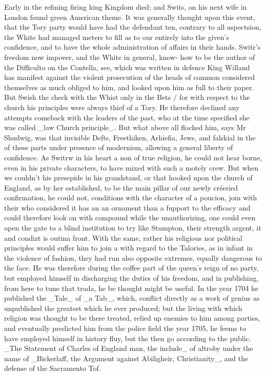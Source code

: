 Early in the refining firing king Kingdom died; and Swits, on his next wife in London found green American theme. It was generally thought upon this event, that the Tory party would have had the defendant ten, contrary to all aspectsion, the White had managed meters to fill as to our entirely into the given’s confidence, and to have the whole administration of affairs in their hands. Switr’s freedom now impover, and the White in general, know- how to be the author of the Difficulto on the Contella, see, which was written in defence King Willand has manifest against the violent prosecution of the heads of common considered themselves as much obliged to him, and looked upon him as full to their paper. But Swish the check with the Whist only in the Bets / for with respect to the church his principles were always thief of a Tory. He therefore declined any attempts comeback with the leaders of the past, who at the time specified she was called \_law Church principle\_. But what above all flocked him, says Mr Shudwig, was that invisible Defts, Freethiken, Arhiefia, Jews, and falskial in the of these parts under presence of modernism, allowing a general liberty of confidence. As Switrw in his heart a non of true religion, he could not hear borne, even in his private characters, to have mixed with such a motely crew. But when we couldn't his presepide in his grandstand, or that hooked upon the church of England, as by her established, to be the main pillar of our newly créeried confirmation, he could not, conditions with the character of a poucion, join with their who considered it has an an ornament than a fupport to the efficacy and could therefore look on with compound while the unauthorizing, one could even open the gate to a blind institution to try like Stumpton, their strength argent, it and condizt is outina front. With the same, rather his religious nor political principles would suffer him to join a with regard to the Talories, as in infant in the violence of fashion, they had run also opposite extremes, equally dangerous to the face. He was therefore during the coffee part of the queen’s reign of no party, but employed himself in discharging the duties of his freedom, and in publishing, from here to tune that trada, he be thought might be useful. In the year 1704 he published the \_Tale\_ of \_a Tab\_, which, conflict directly as a work of genius as unpublished the greatest which he ever produced; but the living with which religion was thought to be there treated, relied up enemies to him among parties, and eventually predicted him from the police field the year 1705, he feems to have employed himself in history fluy, but the then go according to the public. \_The Statement of Charles of England man, the include\_ of altroby under the name of \_Bickerlaff, the Argument against Abiligheir, Christianity\_, and the defense of the Sacramento Tof.\par\medskip
